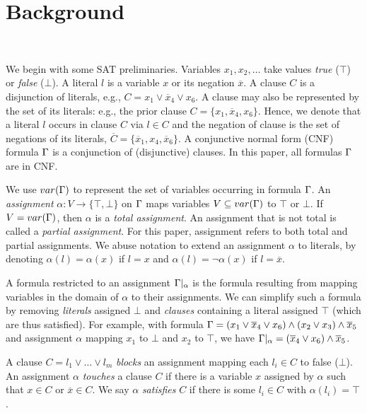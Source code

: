 \section{Background}~\label{sec:background}

We begin with some SAT preliminaries. Variables $x_1, x_2, \dots$ take values
\emph{true} ($\top$) or \emph{false} ($\bot$). A literal $l$ is a variable $x$
or its negation $\overline{x}$. A clause $C$ is a disjunction of literals, e.g.,
$C = x_1 \lor \overline{x}_4 \lor x_6$. A clause may also be represented by the
set of its literals: e.g., the prior clause $C = \{x_1, \overline{x}_4, x_6\}$.
Hence, we denote that a literal $l$ occurs in clause $C$ via $l \in C$ and the
negation of clause is the set of negations of its literals, $\overline{C} =
\{\overline{x}_1, x_4, \overline{x}_6\}$. A conjunctive normal form (CNF)
formula $\Gamma$ is a conjunction of (disjunctive) clauses. In this paper, all
formulas $\Gamma$ are in CNF.

We use $var(\Gamma)$ to represent the set of variables occurring in formula
$\Gamma$. An \emph{assignment} $\alpha : V \rightarrow \{\top, \bot\}$ on
$\Gamma$ maps variables $V \subseteq var(\Gamma)$ to $\top$ or $\bot$. If $V
= var(\Gamma)$, then $\alpha$ is a \emph{total assignment}. An assignment that
is not total is called a \emph{partial assignment}. For this paper, assignment
refers to both total and partial assignments. We abuse notation to extend  an
assignment $\alpha$ to literals, by denoting $\alpha(l) = \alpha(x)$ if $l = x$
and $\alpha(l) = \neg \alpha(x)$ if $l = \overline{x}$.

A formula restricted to an assignment $\Gamma|_\alpha$ is the formula
resulting from mapping variables in the domain of $\alpha$ to their assignments.
We can simplify such a formula by removing \emph{literals} assigned $\bot$ and
\emph{clauses} containing a literal assigned $\top$ (which are thus satisfied).
For example, with formula $\Gamma = (x_1 \lor \overline{x}_4 \lor x_6) \land
(x_2 \lor x_3) \land \overline{x}_5$ and assignment $\alpha$ mapping $x_1$ to
$\bot$ and $x_2$ to $\top$, we have $\Gamma|_\alpha = (\overline{x}_4 \lor
x_6) \land \overline{x}_5$.

A clause $C = l_1 \lor \dots \lor l_m$ \emph{blocks} an assignment mapping each
$l_i \in C$ to false ($\bot$). An assignment $\alpha$ \emph{touches} a clause
$C$ if there is a variable $x$ assigned by $\alpha$ such that $x \in C$ or
$\overline{x} \in C$. We say $\alpha$ \emph{satisfies} $C$ if there is some $l_i
\in C$ with $\alpha(l_i) = \top$.

